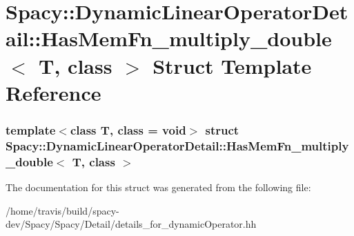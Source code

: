 \hypertarget{structSpacy_1_1DynamicLinearOperatorDetail_1_1HasMemFn__multiply__double}{\section{\-Spacy\-:\-:\-Dynamic\-Linear\-Operator\-Detail\-:\-:\-Has\-Mem\-Fn\-\_\-multiply\-\_\-double$<$ \-T, class $>$ \-Struct \-Template \-Reference}
\label{structSpacy_1_1DynamicLinearOperatorDetail_1_1HasMemFn__multiply__double}
}
\subsubsection*{template$<$class T, class = void$>$ struct Spacy\-::\-Dynamic\-Linear\-Operator\-Detail\-::\-Has\-Mem\-Fn\-\_\-multiply\-\_\-double$<$ T, class $>$}



\-The documentation for this struct was generated from the following file\-:\begin{DoxyCompactItemize}
\item 
/home/travis/build/spacy-\/dev/\-Spacy/\-Spacy/\-Detail/details\-\_\-for\-\_\-dynamic\-Operator.\-hh\end{DoxyCompactItemize}
